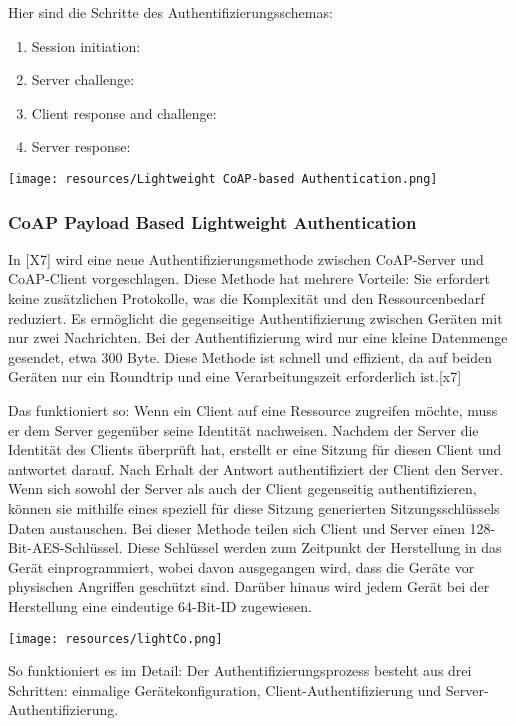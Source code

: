 Hier sind die Schritte des Authentifizierungsschemas:

\begin{enumerate}
    \item Session initiation:
    \item Server challenge:
    \item Client response and challenge:
    \item Server response:
\end{enumerate}

\texttt{[image: resources/Lightweight CoAP-based Authentication.png]}

\subsubsection{CoAP Payload Based Lightweight Authentication}

In [X7] wird eine neue Authentifizierungsmethode zwischen CoAP-Server und CoAP-Client vorgeschlagen. Diese Methode hat mehrere Vorteile: Sie erfordert keine zusätzlichen Protokolle, was die Komplexität und den Ressourcenbedarf reduziert. Es ermöglicht die gegenseitige Authentifizierung zwischen Geräten mit nur zwei Nachrichten. Bei der Authentifizierung wird nur eine kleine Datenmenge gesendet, etwa 300 Byte. Diese Methode ist schnell und effizient, da auf beiden Geräten nur ein Roundtrip und eine Verarbeitungszeit erforderlich ist.[x7]


Das funktioniert so: Wenn ein Client auf eine Ressource zugreifen möchte, muss er dem Server gegenüber seine Identität nachweisen. Nachdem der Server die Identität des Clients überprüft hat, erstellt er eine Sitzung für diesen Client und antwortet darauf. Nach Erhalt der Antwort authentifiziert der Client den Server. Wenn sich sowohl der Server als auch der Client gegenseitig authentifizieren, können sie mithilfe eines speziell für diese Sitzung generierten Sitzungsschlüssels Daten austauschen. Bei dieser Methode teilen sich Client und Server einen 128-Bit-AES-Schlüssel. Diese Schlüssel werden zum Zeitpunkt der Herstellung in das Gerät einprogrammiert, wobei davon ausgegangen wird, dass die Geräte vor physischen Angriffen geschützt sind. Darüber hinaus wird jedem Gerät bei der Herstellung eine eindeutige 64-Bit-ID zugewiesen.

\texttt{[image: resources/lightCo.png]}


So funktioniert es im Detail:
Der Authentifizierungsprozess besteht aus drei Schritten: einmalige Gerätekonfiguration, Client-Authentifizierung und Server-Authentifizierung.

